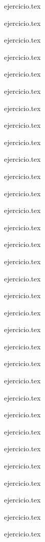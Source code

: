 \begin{enumerate}
    \begin{minipage}{0.45\textwidth}
    \setcounter{enumi}{4}
    {ejercicio.tex}
    \addtocounter{enumi}{1}
    {ejercicio.tex}
    \addtocounter{enumi}{1}
    {ejercicio.tex}
    \addtocounter{enumi}{1}
    {ejercicio.tex}
    \addtocounter{enumi}{1}
    {ejercicio.tex}
    \addtocounter{enumi}{1}
    {ejercicio.tex}
    \addtocounter{enumi}{1}
    {ejercicio.tex}
    \addtocounter{enumi}{1}
    {ejercicio.tex}
    \addtocounter{enumi}{1}
    {ejercicio.tex}
    \addtocounter{enumi}{1}
    {ejercicio.tex}
    \addtocounter{enumi}{1}
    {ejercicio.tex}
    \addtocounter{enumi}{1}
    {ejercicio.tex}
    \addtocounter{enumi}{1}
    {ejercicio.tex}
    \addtocounter{enumi}{1}
    {ejercicio.tex}
    \addtocounter{enumi}{1}
    {ejercicio.tex}
    \addtocounter{enumi}{1}
    {ejercicio.tex}
    \addtocounter{enumi}{1}
    {ejercicio.tex}
    \addtocounter{enumi}{1}
    {ejercicio.tex}
    \addtocounter{enumi}{1}
    {ejercicio.tex}
    \addtocounter{enumi}{1}
    {ejercicio.tex}
    \addtocounter{enumi}{1}
    {ejercicio.tex}
    \addtocounter{enumi}{1}
    {ejercicio.tex}
    \addtocounter{enumi}{1}
    {ejercicio.tex}
    \addtocounter{enumi}{1}
    {ejercicio.tex}
    \end{minipage}%
    \begin{minipage}{0.45\textwidth}
    \setcounter{enumi}{5}
    {ejercicio.tex}
    \addtocounter{enumi}{1}
    {ejercicio.tex}
    \addtocounter{enumi}{1}
    {ejercicio.tex}
    \addtocounter{enumi}{1}
    {ejercicio.tex}
    \addtocounter{enumi}{1}
    {ejercicio.tex}
    \addtocounter{enumi}{1}
    {ejercicio.tex}
    \addtocounter{enumi}{1}
    {ejercicio.tex}
    \addtocounter{enumi}{1}
    {ejercicio.tex}

\end{minipage}
\end{enumerate}
